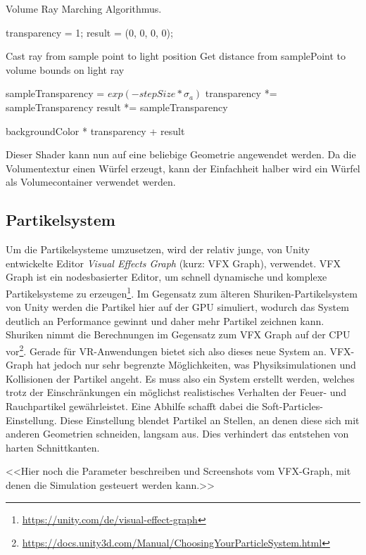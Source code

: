 \begin{algorithm}
	\caption{Volume Ray Marching Algorithmus.}\label{alg:rayM}
	\begin{algorithmic}[1]
		\State transparency = 1;
		\State result = (0, 0, 0, 0);
		
		
		\State Cast ray from sample point to light position
		\State Get distance from samplePoint to volume bounds on light ray

		\State sampleTransparency = $exp(-stepSize * \sigma_a)$
		\State transparency *= sampleTransparency
		\State result *= sampleTransparency
		\EndFor
		
		\Return backgroundColor * transparency + result
	\end{algorithmic}
\end{algorithm}

Dieser Shader kann nun auf eine beliebige Geometrie angewendet werden. 
Da die Volumentextur einen Würfel erzeugt, kann der Einfachheit halber wird ein Würfel als Volumecontainer verwendet werden.


\subsection{Partikelsystem}
Um die Partikelsysteme umzusetzen, wird der relativ junge, von Unity entwickelte Editor \textit{Visual Effects Graph}
(kurz: VFX Graph), verwendet. VFX Graph ist ein nodesbasierter Editor, um schnell
dynamische und komplexe Partikelsysteme zu erzeugen\footnote{\url{https://unity.com/de/visual-effect-graph}}.
Im Gegensatz zum älteren Shuriken-Partikelsystem von Unity werden die Partikel hier auf der GPU
simuliert, wodurch das System deutlich an Performance gewinnt und daher mehr Partikel zeichnen kann.
Shuriken nimmt die Berechnungen im Gegensatz zum VFX Graph auf der CPU vor\footnote{\url{https://docs.unity3d.com/Manual/ChoosingYourParticleSystem.html}}.
Gerade für VR-Anwendungen bietet sich also dieses neue System an.
VFX-Graph hat jedoch nur sehr begrenzte Möglichkeiten, was Physiksimulationen und Kollisionen der Partikel angeht.
Es muss also ein System erstellt werden, welches trotz der Einschränkungen ein möglichst realistisches
Verhalten der Feuer- und Rauchpartikel gewährleistet. Eine Abhilfe schafft dabei die Soft-Particles-Einstellung. 
Diese Einstellung blendet Partikel an Stellen, an denen diese sich mit anderen Geometrien schneiden, langsam aus.
Dies verhindert das entstehen von harten Schnittkanten.


<<Hier noch die Parameter beschreiben und Screenshots vom VFX-Graph, mit denen die Simulation gesteuert werden kann.>>